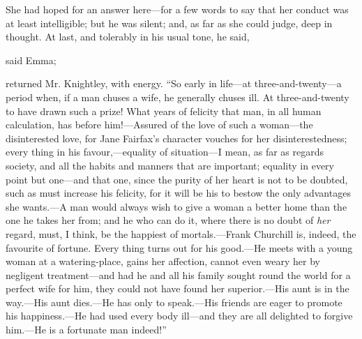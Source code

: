 She had hoped for an answer here---for a few words to say that her conduct was at least intelligible; but he was silent; and, as far as she could judge, deep in thought. At last, and tolerably in his usual tone, he said,


 said Emma; 

 returned Mr. Knightley, with energy. “So early in life---at three-and-twenty---a period when, if a man chuses a wife, he generally chuses ill. At three-and-twenty to have drawn such a prize! What years of felicity that man, in all human calculation, has before him!---Assured of the love of such a woman---the disinterested love, for Jane Fairfax's character vouches for her disinterestedness; every thing in his favour,---equality of situation---I mean, as far as regards society, and all the habits and manners that are important; equality in every point but one---and that one, since the purity of her heart is not to be doubted, such as must increase his felicity, for it will be his to bestow the only advantages she wants.---A man would always wish to give a woman a better home than the one he takes her from; and he who can do it, where there is no doubt of {\em her} regard, must, I think, be the happiest of mortals.---Frank Churchill is, indeed, the favourite of fortune. Every thing turns out for his good.---He meets with a young woman at a watering-place, gains her affection, cannot even weary her by negligent treatment---and had he and all his family sought round the world for a perfect wife for him, they could not have found her superior.---His aunt is in the way.---His aunt dies.---He has only to speak.---His friends are eager to promote his happiness.---He had used every body ill---and they are all delighted to forgive him.---He is a fortunate man indeed!”



